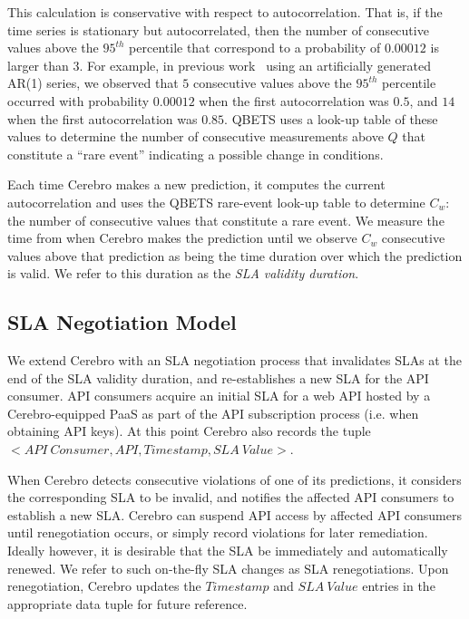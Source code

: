 This calculation is conservative with respect to autocorrelation. That is, if
the time series is stationary but autocorrelated, then the number of consecutive 
values above the $95^{th}$ percentile that correspond to a probability of
$0.00012$ is larger than $3$.  For example, in previous
work~\cite{Nurmi:2007:QQB:1791551.1791556}
using an artificially generated AR(1) series, 
we observed that $5$ consecutive values above the $95^{th}$ percentile
occurred with probability $0.00012$ when the first autocorrelation was $0.5$,
and $14$ when the first autocorrelation was $0.85$. QBETS uses a look-up
table of these values to determine the number of consecutive measurements above
$Q$ that constitute a ``rare event'' indicating a possible change in conditions.

Each time Cerebro makes a new prediction, it computes the current
autocorrelation and uses the QBETS rare-event look-up table to determine $C_{w}$:
the number of consecutive values that constitute a rare event.
We measure the time from when
Cerebro makes the prediction until we observe $C_{w}$ 
consecutive values above that prediction 
as being the time duration over which
the prediction is valid. 
We refer to this duration as the \textit{SLA validity duration}.  


\vspace{-0.1in}
\subsection{ SLA Negotiation Model}
\vspace{-0.1in}
We extend Cerebro with an SLA negotiation process that invalidates SLAs at the end of the
SLA validity duration, and re-establishes a new SLA for the API consumer.
API consumers acquire an initial SLA for a web API hosted by a Cerebro-equipped PaaS
as part of the API subscription process (i.e. when obtaining API keys).
At this point Cerebro also records the 
tuple $<API\ Consumer, API, Timestamp, SLA\ Value>$.

When Cerebro detects consecutive violations of one of its predictions,
it considers the corresponding SLA to be invalid, 
and notifies the affected API consumers to establish a 
new SLA. Cerebro can suspend API access by affected API consumers until 
renegotiation occurs, or simply record violations for later remediation.
Ideally however, it is desirable that the SLA be immediately and automatically 
renewed. We refer to such on-the-fly
SLA changes as SLA renegotiations. Upon renegotiation, 
Cerebro updates the $Timestamp$ and $SLA\ Value$ entries
in the appropriate data tuple for future reference.

